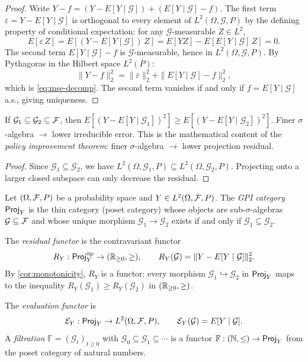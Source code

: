 \begin{proof}
Write $Y - f = (Y - E[Y \mid \mathcal{G}]) + (E[Y \mid \mathcal{G}] - f)$. The first term $\varepsilon = Y - E[Y \mid \mathcal{G}]$ is orthogonal to every element of $L^2(\Omega, \mathcal{G}, P)$ by the defining property of conditional expectation: for any $\mathcal{G}$-measurable $Z \in L^2$,
\[
E[\varepsilon \, Z] = E[(Y - E[Y \mid \mathcal{G}]) \, Z] = E[YZ] - E[E[Y \mid \mathcal{G}] \, Z] = 0.
\]
The second term $E[Y \mid \mathcal{G}] - f$ is $\mathcal{G}$-measurable, hence in $L^2(\Omega, \mathcal{G}, P)$. By Pythagoras in the Hilbert space $L^2(P)$:
\[
\|Y - f\|_2^2 = \|\varepsilon\|_2^2 + \|E[Y \mid \mathcal{G}] - f\|_2^2,
\]
which is \eqref{eq:mse-decomp}. The second term vanishes if and only if $f = E[Y \mid \mathcal{G}]$ a.s., giving uniqueness.
\end{proof}

\begin{corollary}[Monotonicity]\label{cor:monotonicity}
If $\mathcal{G}_1 \subseteq \mathcal{G}_2 \subseteq \mathcal{F}$, then $E[(Y - E[Y \mid \mathcal{G}_1])^2] \geq E[(Y - E[Y \mid \mathcal{G}_2])^2]$. Finer $\sigma$-algebra $\to$ lower irreducible error. This is the mathematical content of the \emph{policy improvement theorem}: finer $\sigma$-algebra $\to$ lower projection residual.
\end{corollary}

\begin{proof}
Since $\mathcal{G}_1 \subseteq \mathcal{G}_2$, we have $L^2(\Omega, \mathcal{G}_1, P) \subseteq L^2(\Omega, \mathcal{G}_2, P)$. Projecting onto a larger closed subspace can only decrease the residual.
\end{proof}

\begin{definition}\label{def:gpi-category}
Let $(\Omega, \mathcal{F}, P)$ be a probability space and $Y \in L^2(\Omega, \mathcal{F}, P)$.
The \emph{GPI category} $\mathsf{Proj}_Y$ is the thin category (poset category) whose
objects are sub-$\sigma$-algebras $\mathcal{G} \subseteq \mathcal{F}$ and whose unique
morphism $\mathcal{G}_1 \to \mathcal{G}_2$ exists if and only if
$\mathcal{G}_1 \subseteq \mathcal{G}_2$.

The \emph{residual functor} is the contravariant functor
\[
R_Y : \mathsf{Proj}_Y^{\mathrm{op}} \to (\mathbb{R}_{\geq 0}, \geq), \qquad
R_Y(\mathcal{G}) = \|Y - E[Y \mid \mathcal{G}]\|_2^2.
\]
By \cref{cor:monotonicity}, $R_Y$ is a functor: every morphism
$\mathcal{G}_1 \hookrightarrow \mathcal{G}_2$ in $\mathsf{Proj}_Y$ maps to the
inequality $R_Y(\mathcal{G}_1) \geq R_Y(\mathcal{G}_2)$ in
$(\mathbb{R}_{\geq 0}, \geq)$.

The \emph{evaluation functor} is
\[
\mathcal{E}_Y : \mathsf{Proj}_Y \to L^2(\Omega, \mathcal{F}, P), \qquad
\mathcal{E}_Y(\mathcal{G}) = E[Y \mid \mathcal{G}].
\]
A \emph{filtration} $\mathbb{F} = (\mathcal{G}_t)_{t \geq 0}$ with
$\mathcal{G}_0 \subseteq \mathcal{G}_1 \subseteq \cdots$ is a functor
$\mathbb{F} : (\mathbb{N}, \leq) \to \mathsf{Proj}_Y$ from the poset category of
natural numbers.
\end{definition}

